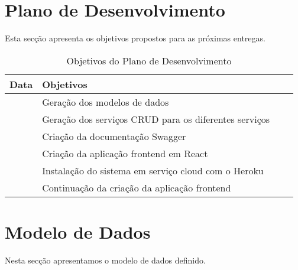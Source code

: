 \documentclass[11pt]{report}
\begin{document}
\clearpage

\section*{Plano de Desenvolvimento}

Esta secção apresenta os objetivos propostos para as próximas entregas.

\begin{center}
\begin{table}[h!]
\begin{tabularx}{\textwidth}{@{} >{\hsize}L >{\hsize}L l l @{}} 
\hline
\textbf{Data} & \textbf{Objetivos}  \\
\hline
{} & Geração dos modelos de dados
  \\ 

\hline
{} & Geração dos serviços CRUD para os diferentes serviços  \\ 
& Criação da documentação Swagger\\ 
& Criação da aplicação frontend em React \\ 
\hline
{} & Instalação do sistema em serviço cloud com o Heroku\\ 
& Continuação da criação da aplicação frontend\\ 
 
\hline
\end{tabularx}
\caption{Objetivos do Plano de Desenvolvimento}
\label{table:1}
\end{table}
\end{center}

\clearpage



\section*{Modelo de Dados}

Nesta secção apresentamos o modelo de dados definido.
\end{document}
